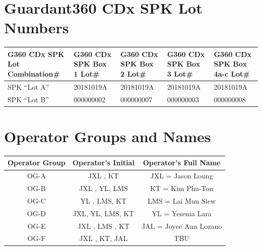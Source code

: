 \documentclass[12pt]{protocol}
\begin{document}
\begin{appendices}
\section{Guardant360 CDx SPK Lot Numbers}
\label{a:Guardant360_CDx_SPK_Lot_Numbers}
\begin{tabular}{|L{1.4in}|L{1.3in}|L{1.3in}|L{1.3in}|L{1.3in}|}
\hline
     \textbf{G360 CDx SPK Lot Combination\#} & 
    \textbf{G360 CDx SPK Box 1 Lot\#} & \textbf{G360 CDx SPK Box 2 Lot\#} & 
    \textbf{G360 CDx SPK Box 3 Lot\#} & \textbf{G360 CDx SPK Box 4a-c Lot\#}\\ \hline
    SPK ``Lot A'' & 20181019A & 20181019A & 20181019A & 20181019A \\ \hline
    SPK ``Lot B'' & 000000002 & 000000007 & 000000003 & 000000008 \\ \hline
\end{tabular}
\clearpage

\section{Operator Groups and Names}
\label{a:Operator_groups_and_names}
\begin{center}
\begin{tabular}{|c|c|c|}
\hline
\rowcolor[gray] {0.85} \textbf{Operator Group} & 
    \textbf{Operator's Initial} & \textbf{Operator's Full Name} \\ \hline
OG-A & JXL , KT & JXL = Jason Loung \\ \hline
OG-B & JXL , YL, LMS & KT = Kim Phu-Ton \\ \hline
OG-C & YL , LMS, KT & LMS = Lai Mun Siew \\ \hline
OG-D & JXL, YL, LMS, KT & YL = Yesenia Lara \\ \hline
OG-E & JXL , LMS , KT  & JAL = Joyce Ann Lozano \\ \hline
OG-F & JXL , KT, JAL & TBU \\ \hline
\end {tabular}
\end{center}
\clearpage

\newpage

\end{appendices}
\end{document}
